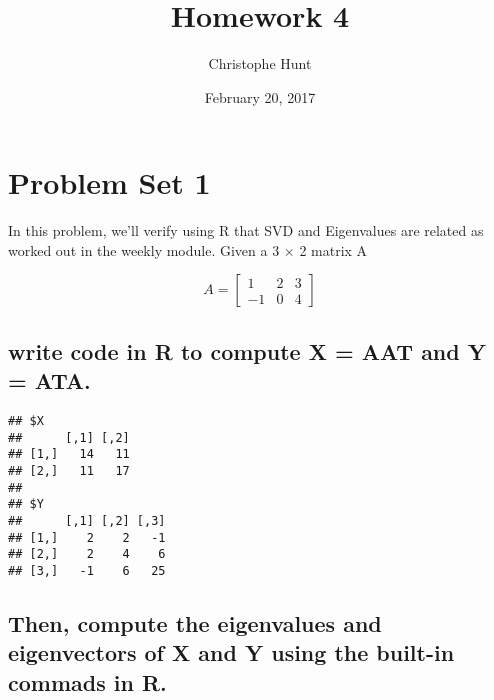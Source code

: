 \documentclass[]{article}
\title{Homework 4}
\author{Christophe Hunt}
\date{February 20, 2017}
\newenvironment{Shaded}{\begin{snugshade}}{\end{snugshade}}
\newcommand{\KeywordTok}[1]{\textcolor[rgb]{0.13,0.29,0.53}{\textbf{{#1}}}}
\newcommand{\DataTypeTok}[1]{\textcolor[rgb]{0.13,0.29,0.53}{{#1}}}
\newcommand{\DecValTok}[1]{\textcolor[rgb]{0.00,0.00,0.81}{{#1}}}
\newcommand{\StringTok}[1]{\textcolor[rgb]{0.31,0.60,0.02}{{#1}}}
\newcommand{\NormalTok}[1]{{#1}}
\begin{document}
\maketitle

{
\setcounter{tocdepth}{2}
\tableofcontents
}
\section{Problem Set 1}\label{problem-set-1}

In this problem, we'll verify using R that SVD and Eigenvalues are
related as worked out in the weekly module. Given a 3 × 2 matrix A

\[
A = \begin{bmatrix}
    1 & 2 & 3 \\
   -1 & 0 & 4 
\end{bmatrix}
\]

\subsection{write code in R to compute X = AAT and Y =
ATA.}\label{write-code-in-r-to-compute-x-aat-and-y-ata.}

\begin{Shaded}
\end{Shaded}

\begin{verbatim}
## $X
##      [,1] [,2]
## [1,]   14   11
## [2,]   11   17
## 
## $Y
##      [,1] [,2] [,3]
## [1,]    2    2   -1
## [2,]    2    4    6
## [3,]   -1    6   25
\end{verbatim}

\newpage

\subsection{Then, compute the eigenvalues and eigenvectors of X and Y
using the built-in commads in
R.}\label{then-compute-the-eigenvalues-and-eigenvectors-of-x-and-y-using-the-built-in-commads-in-r.}
\end{document}

